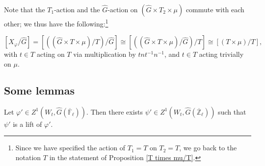 Note that the $T_1$-action and the $\hat{G}$-action on $(\hat{G} \times T_2 \times \mu)$ commute with each other; we thus have the following:\footnote{Since we have specified the action of $T_1=T$ on $T_2=T$, we go back to the notation $T$ in the statement of Proposition \ref{T times mu/T}.}

\begin{proposition}\label{T times mu/T}
	$$[X_{\varphi}/\hat{G}]=\left[\left((\hat{G} \times T \times \mu)/T\right)/\hat{G}\right] \cong \left[\left((\hat{G} \times T \times \mu)/\hat{G}\right)/T\right] \cong [(T \times \mu)/T],$$ 
	with $t \in T$ acting on $T$ via multiplication by $tnt^{-1}n^{-1}$, and $t \in T$ acting trivially on $\mu$. 
\end{proposition}

\subsection{Some lemmas}

\begin{lemma}\label{Lem generalizing}
	Let $\varphi' \in Z^1(W_t, \hat{G}(\overline{\mathbb{F}}_{\ell}))$. Then there exists $\psi' \in Z^1(W_t, \hat{G}(\overline{\mathbb{Z}}_{\ell}))$ such that $\psi'$ is a lift of $\varphi'$.
\end{lemma}

